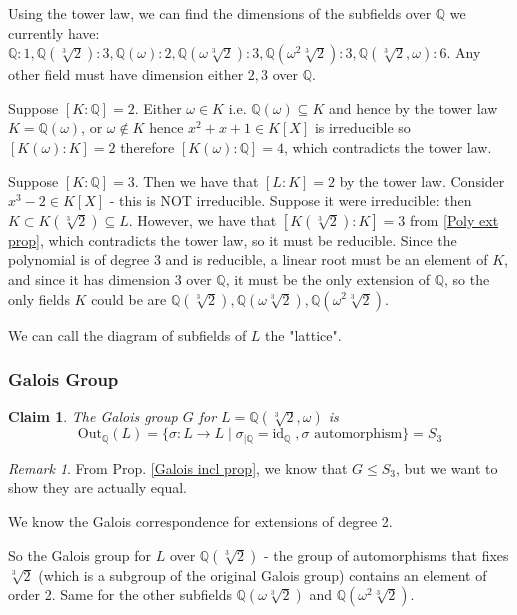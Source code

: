 \documentclass{article}
\theoremstyle{definition}
\theoremstyle{plain}%
\newtheorem*{clm}{Claim}
\theoremstyle{remark}
\newtheorem*{rem}{Remark}
\newcommand{\Q}{\mathbb{Q}}
\begin{document}
Using the tower law, we can find the dimensions of the subfields over $\Q$ we currently have: $\Q : 1, \Q(\sqrt[3]{2}) : 3, \Q(\omega) : 2, \Q(\omega\sqrt[3]{2}) : 3, \Q(\omega^2\sqrt[3]{2}) : 3, \Q(\sqrt[3]{2}, \omega) : 6$. Any other field must have dimension either $2,3$ over $\Q$.

Suppose $[K : \Q] = 2$. Either $\omega \in K$ i.e. $\Q(\omega) \subseteq K$ and hence by the tower law $K = \Q(\omega)$, or $\omega \not\in K$ hence $x^2 + x + 1 \in K[X]$ is irreducible so $[K(\omega) : K] = 2$ therefore $[K(\omega) : \Q] = 4$, which contradicts the tower law.

Suppose $[K : \Q] = 3$. Then we have that $[L : K] =2$ by the tower law. Consider $x^3 - 2 \in K[X]$ - this is NOT irreducible. Suppose it were irreducible: then $K \subset K(\sqrt[3]{2}) \subseteq L$. However, we have that $[K(\sqrt[3]{2}) : K] = 3$ from \ref{Poly ext prop}, which contradicts the tower law, so it must be reducible. Since the polynomial is of degree 3 and is reducible, a linear root must be an element of $K$, and since it has dimension 3 over $\Q$, it must be the only extension of $\Q$, so the only fields $K$ could be are $\Q(\sqrt[3]{2}),  \Q(\omega\sqrt[3]{2}), \Q(\omega^2\sqrt[3]{2})$.


We can call the diagram of subfields of $L$ the "lattice".

\subsubsection{Galois Group}

\begin{clm}
The Galois group $G$ for $L = \Q(\sqrt[3]{2}, \omega)$ is \[\text{Out}_{\Q}(L) = \{\sigma: L \to L \; | \; \sigma_{|\Q} = \text{id}_{\Q} \;, \sigma  \text{ automorphism}\} = S_3\]
\end{clm}

\begin{rem}
From Prop. \ref{Galois incl prop}, we know that $G \le S_3$, but we want to show they are actually equal.
\end{rem}

We know the Galois correspondence for extensions of degree 2.

So the Galois group for $L$ over $\Q(\sqrt[3]{2})$ - the group of automorphisms that fixes $\sqrt[3]{2}$ (which is a subgroup of the original Galois group) contains an element of order 2. Same for the other subfields $\Q(\omega\sqrt[3]{2})$ and $\Q(\omega^2\sqrt[3]{2})$.
\end{document}
